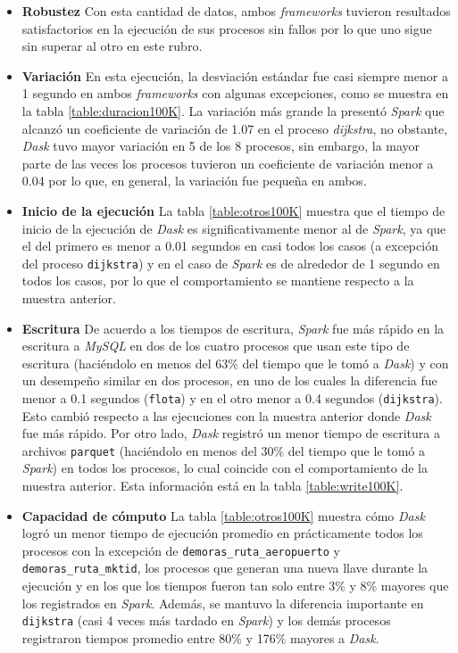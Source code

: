 \begin{itemize}
	\item \textbf{Robustez} Con esta cantidad de datos, ambos \textit{frameworks} tuvieron resultados satisfactorios en la ejecución de sus procesos sin fallos por lo que uno sigue sin superar al otro en este rubro.
	
	\item \textbf{Variación} En esta ejecución, la desviación estándar fue casi siempre menor a 1 segundo en ambos \textit{frameworks} con algunas excepciones, como se muestra en la tabla \ref{table:duracion100K}. La variación más grande la presentó \textit{Spark} que alcanzó un coeficiente de variación de 1.07 en el proceso \textit{dijkstra}, no obstante, \textit{Dask} tuvo mayor variación en 5 de los 8 procesos, sin embargo, la mayor parte de las veces los procesos tuvieron un coeficiente de variación menor a 0.04 por lo que, en general, la variación fue pequeña en ambos.
	
	\item \textbf{Inicio de la ejecución} La tabla \ref{table:otros100K} muestra que el tiempo de inicio de la ejecución de \textit{Dask} es significativamente menor al de \textit{Spark}, ya que el del primero es menor a 0.01 segundos en casi todos los casos (a excepción del proceso \texttt{dijkstra}) y en el caso de \textit{Spark} es de alrededor de 1 segundo en todos los casos, por lo que el comportamiento se mantiene respecto a la muestra anterior.
	
	\item \textbf{Escritura} De acuerdo a los tiempos de escritura, \textit{Spark} fue más rápido en la escritura a \textit{MySQL} en dos de los cuatro procesos que usan este tipo de escritura (haciéndolo en menos del 63\% del tiempo que le tomó a \textit{Dask}) y con un desempeño similar en dos procesos, en uno de los cuales la diferencia fue menor a 0.1 segundos (\texttt{flota}) y en el otro menor a 0.4 segundos (\texttt{dijkstra}). Esto cambió respecto a las ejecuciones con la muestra anterior donde \textit{Dask} fue más rápido. Por otro lado, \textit{Dask} registró un menor tiempo de escritura a archivos \texttt{parquet} (haciéndolo en menos del 30\% del tiempo que le tomó a \textit{Spark}) en todos los procesos, lo cual coincide con el comportamiento de la muestra anterior. Esta información está en la tabla \ref{table:write100K}.
	
	\item \textbf{Capacidad de cómputo} La tabla \ref{table:otros100K} muestra cómo \textit{Dask} logró un menor tiempo de ejecución promedio en prácticamente todos los procesos con la excepción de \texttt{demoras\_ruta\_aeropuerto} y \texttt{demoras\_ruta\_mktid}, los procesos que generan una nueva llave durante la ejecución y en los que los tiempos fueron tan solo entre 3\% y 8\% mayores que los registrados en \textit{Spark}. Además, se mantuvo la diferencia importante en \texttt{dijkstra} (casi 4 veces más tardado en \textit{Spark}) y los demás procesos registraron tiempos promedio entre 80\% y 176\% mayores a \textit{Dask}.
	

\end{itemize}
